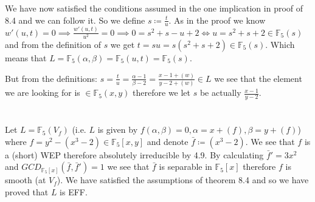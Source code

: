 \documentclass[12pt, a4paper]{article}
\begin{document}
We have now satisfied the conditions assumed in the one implication in proof of 8.4 and we can follow it. So we define $s \coloneqq \frac{t}{u}$. As in the proof we know $w'(u,t)=0 \implies \frac{w'(u,t)}{u^2} = 0 \implies 0 = s^2+s-u+2 \iff u = s^2+s+2 \in \mathbb{F}_5(s)$ and from the definition of $s$ we get $t = su = s(s^2+s+2)\in \mathbb{F}_5(s)$. Which means that $L = \mathbb{F}_5(\alpha,\beta)=\mathbb{F}_5(u,t) = \mathbb{F}_5(s)$. 

But from the definitions: $s = \frac{t}{u} = \frac{\alpha-1}{\beta-2} = \frac{x-1 + (w)}{y-2 + (w)} \in L$ we see that the element we are looking for is $\in \mathbb{F}_5(x,y)$ therefore we let $s$ be actually $\frac{x-1}{y-2}$.

\section{}
Let $L = \mathbb{F}_5(V_f)$ (i.e. $L$ is given by $f(\alpha,\beta)=0, \alpha = x+(f), \beta= y +(f) $) where $f = y^2-(x^3-2) \in \mathbb{F}_5[x,y]$ and denote $\bar{f} \coloneqq (x^3-2)$. We see that $f$ is a (short) WEP therefore absolutely irreducible by 4.9. By calculating $\bar{f}' = 3x^2$ and $GCD_{\mathbb{F}_5[x]}(\bar{f},\bar{f}') = 1$ we see that $\bar{f}$ is separable in $\mathbb{F}_5[x]$ therefore $f$ is smooth (at $V_f$). We have satisfied the assumptions of theorem 8.4 and so we have proved that $L$ is EFF. 
\end{document}
